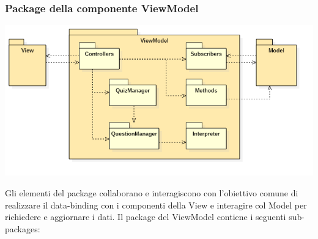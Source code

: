 \subsubsection{Package della componente ViewModel}
	\begin{center}
		\includegraphics[scale=0.6]{../images/ViewModelPackage.png}
	\end{center}
	Gli elementi del package collaborano e interagiscono con l'obiettivo comune di realizzare il data-binding con i componenti della View e interagire col Model per richiedere e aggiornare i dati.
	Il package del ViewModel contiene i seguenti sub-packages:
